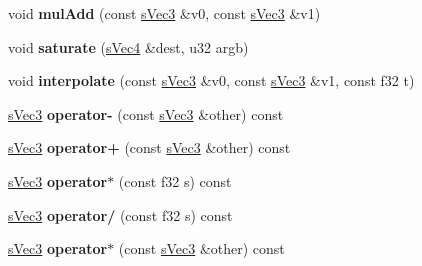 \begin{DoxyCompactItemize}
\item 
\hypertarget{structirr_1_1video_1_1s_vec3_a90732e8948a86ece9c50606f311e337a}{void {\bfseries mul\-Add} (const \hyperlink{structirr_1_1video_1_1s_vec3}{s\-Vec3} \&v0, const \hyperlink{structirr_1_1video_1_1s_vec3}{s\-Vec3} \&v1)}\label{structirr_1_1video_1_1s_vec3_a90732e8948a86ece9c50606f311e337a}

\item 
\hypertarget{structirr_1_1video_1_1s_vec3_ad91bac4a78167291f7fbfc5e4a4c5151}{void {\bfseries saturate} (\hyperlink{structirr_1_1video_1_1s_vec4}{s\-Vec4} \&dest, u32 argb)}\label{structirr_1_1video_1_1s_vec3_ad91bac4a78167291f7fbfc5e4a4c5151}

\item 
\hypertarget{structirr_1_1video_1_1s_vec3_afb2077e0a95f1217b9684c0ea4181ee9}{void {\bfseries interpolate} (const \hyperlink{structirr_1_1video_1_1s_vec3}{s\-Vec3} \&v0, const \hyperlink{structirr_1_1video_1_1s_vec3}{s\-Vec3} \&v1, const f32 t)}\label{structirr_1_1video_1_1s_vec3_afb2077e0a95f1217b9684c0ea4181ee9}

\item 
\hypertarget{structirr_1_1video_1_1s_vec3_a6b0da71c400c95917901808e8e6c43e0}{\hyperlink{structirr_1_1video_1_1s_vec3}{s\-Vec3} {\bfseries operator-\/} (const \hyperlink{structirr_1_1video_1_1s_vec3}{s\-Vec3} \&other) const }\label{structirr_1_1video_1_1s_vec3_a6b0da71c400c95917901808e8e6c43e0}

\item 
\hypertarget{structirr_1_1video_1_1s_vec3_a46871179ce4f25abd8e0eaf84589cf93}{\hyperlink{structirr_1_1video_1_1s_vec3}{s\-Vec3} {\bfseries operator+} (const \hyperlink{structirr_1_1video_1_1s_vec3}{s\-Vec3} \&other) const }\label{structirr_1_1video_1_1s_vec3_a46871179ce4f25abd8e0eaf84589cf93}

\item 
\hypertarget{structirr_1_1video_1_1s_vec3_a2ed27b289d78211555290b46f6669765}{\hyperlink{structirr_1_1video_1_1s_vec3}{s\-Vec3} {\bfseries operator$\ast$} (const f32 s) const }\label{structirr_1_1video_1_1s_vec3_a2ed27b289d78211555290b46f6669765}

\item 
\hypertarget{structirr_1_1video_1_1s_vec3_abd55c42a22287a214a59c57b2681b4d1}{\hyperlink{structirr_1_1video_1_1s_vec3}{s\-Vec3} {\bfseries operator/} (const f32 s) const }\label{structirr_1_1video_1_1s_vec3_abd55c42a22287a214a59c57b2681b4d1}

\item 
\hypertarget{structirr_1_1video_1_1s_vec3_af690e0f66afa667c6cc3e0828bc9031f}{\hyperlink{structirr_1_1video_1_1s_vec3}{s\-Vec3} {\bfseries operator$\ast$} (const \hyperlink{structirr_1_1video_1_1s_vec3}{s\-Vec3} \&other) const }\label{structirr_1_1video_1_1s_vec3_af690e0f66afa667c6cc3e0828bc9031f}


\end{DoxyCompactItemize}
